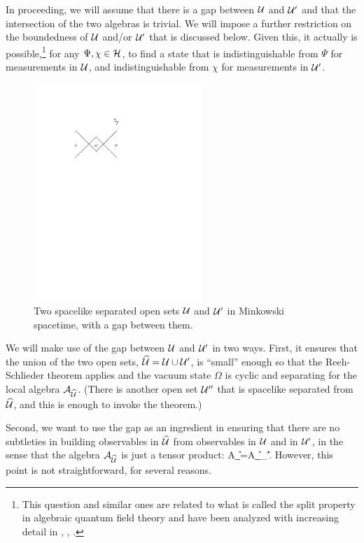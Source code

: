 \documentclass[12pt]{article}
\def\h{\widehat}
\numberwithin{equation}{section}
\def\A{{\mathcal A}}
\begin{document}
In proceeding, we will assume that there is a gap between ${\mathcal U}$ and ${\mathcal U}'$ and that the intersection of the 
two algebras is trivial.    We will impose a further restriction on the boundedness of ${\mathcal U}$ and/or ${\mathcal U}'$ that
is discussed below.  Given this,
it actually is possible,\footnote{This question and similar ones are related to what is called the split property in algebraic
quantum field theory and have been analyzed with increasing detail
in   \cite{Roos}, \cite{Buchholz}, \cite{DL}.}
 for any $\Psi,\chi\in{\mathcal H}$, to find a state that is indistinguishable
from $\Psi$ for measurements in ${\mathcal U}$, and indistinguishable from $\chi$ for measurements in ${\mathcal U}'$.   

  \begin{figure}
 \begin{center}
   \includegraphics[width=2.5in]{Fig5.pdf}
   \end{center}
\caption{\small  Two spacelike separated open sets ${\mathcal U}$ and ${\mathcal U}'$ in Minkowski spacetime, with a gap between them.
\label{Fig5}}
\end{figure}

We will make use of the gap between ${\mathcal U}$ and ${\mathcal U}'$ in two ways.  First, it ensures that the union of the two open sets, 
$\h\U=\U\cup \U'$, 
is ``small'' enough  so that
the Reeh-Schlieder theorem applies and the vacuum state $\Omega$ is cyclic and separating for the local
algebra $\A_{\h\U}$. (There is another open set ${\mathcal U}''$ that is spacelike separated from $\h\U$, and this is enough to
invoke the theorem.)   

Second, we want to use the gap as an ingredient in  ensuring that there are no subtleties in building observables in $\h\U$
from observables in ${\mathcal U}$ and in ${\mathcal U}'$, in the sense that the algebra $\A_{\h\U}$ is just a tensor product:
\be\label{zoldo} \A_{\h\U}=\A_\U\otimes \A_{\U'}. \ee
However, this point is not straightforward, for several reasons.
\end{document}
